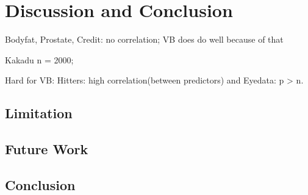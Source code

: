 \chapter{Discussion and Conclusion}

Bodyfat, Prostate, Credit: no correlation; VB does do well because of that

Kakadu n = 2000;

Hard for VB: Hitters: high correlation(between predictors) and Eyedata: p > n.


\label{Chapter5}
\section{Limitation}

\section{Future Work}


\section{Conclusion}